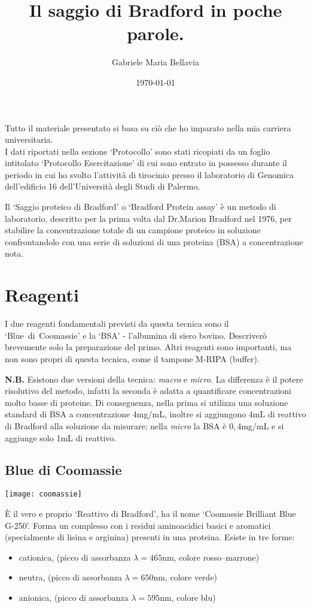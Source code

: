 \documentclass[12pt, a4paper]{article}
\title{Il saggio di Bradford in poche parole.}
\author{Gabriele Maria Bellavia}
\date{\today}
\begin{document}
\maketitle

Tutto il materiale presentato si basa su ciò che ho imparato nella mia carriera universitaria.\\
I dati riportati nella sezione `Protocollo' sono stati ricopiati da un foglio intitolato `Protocollo Esercitazione' di cui sono entrato in possesso durante il periodo in cui ho svolto l'attività di tirocinio presso il laboratorio di Genomica dell'edificio 16 dell'Università degli Studi di Palermo.


Il `Saggio proteico di Bradford' o `Bradford Protein assay' è un metodo di laboratorio, descritto per la prima volta dal Dr.{}Marion Bradford nel 1976, per stabilire la concentrazione totale di un campione proteico in soluzione confrontandolo con una serie di soluzioni di una proteina (BSA) a concentrazione nota.


\section{Reagenti}
I due reagenti fondamentali previsti da questa tecnica sono il \mbox{`Blue di Coomassie'} e la `BSA' - l'albumina di siero bovino.
Descriverò brevemente solo la preparazione del primo.
Altri reagenti sono importanti, ma non sono propri di questa tecnica, come il tampone M-RIPA (buffer).


\textbf{N.B.}
Esistono due versioni della tecnica: \emph{macro} e \emph{micro}.
La differenza è il potere risolutivo del metodo, infatti la seconda è adatta a quantificare concentrazioni molto basse di proteine.
Di conseguenza, nella prima si utilizza una soluzione standard di BSA a concentrazione 4mg/mL, inoltre si aggiungono 4mL di reattivo di Bradford alla soluzione da misurare; nella \emph{micro} la BSA è $0,4$mg/mL e si aggiunge solo 1mL di reattivo.

\subsection*{Blue di Coomassie}
\texttt{[image: coomassie]}


\`E il vero e proprio `Reattivo di Bradford', ha il nome `Coomassie Brilliant Blue G-250'.
Forma un complesso con i residui aminoacidici basici e aromatici (specialmente di lisina e arginina) presenti in una proteina.
Esiste in tre forme:
\begin{itemize}
\item cationica, (picco di assorbanza $\lambda=465$nm, colore rosso--marrone)
\item neutra, (picco di assorbanza $\lambda=650$nm, colore verde)
\item anionica, (picco di assorbanza $\lambda=595$nm, colore blu)
\end{itemize}
\end{document}

